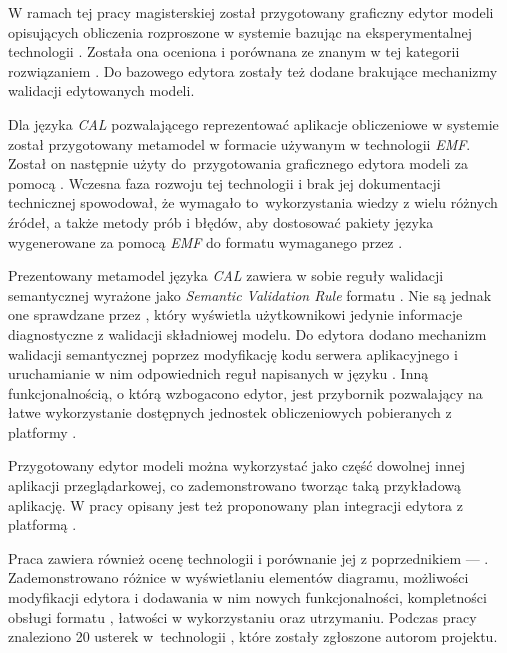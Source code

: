 W ramach tej pracy magisterskiej został przygotowany graficzny edytor modeli
opisujących obliczenia rozproszone w systemie \BalticLSC{} bazując na
eksperymentalnej technologii \SiriusWeb{}. Została ona oceniona i porównana ze
znanym w tej kategorii rozwiązaniem \SiriusDesktop{}. Do bazowego edytora
\SiriusWeb{} zostały też dodane brakujące mechanizmy walidacji edytowanych
modeli.

Dla języka \emph{\acrfull{CAL}} pozwalającego reprezentować aplikacje
obliczeniowe w systemie \BalticLSC{} został przygotowany metamodel w formacie
\Ecore{} używanym w technologii \emph{\acrfull{EMF}}. Został on następnie użyty
do~przygotowania graficznego edytora modeli za pomocą \SiriusWeb{}. Wczesna
faza rozwoju tej technologii i brak jej dokumentacji technicznej spowodował, że
wymagało to~wykorzystania wiedzy z wielu różnych źródeł, a także
metody prób i błędów, aby dostosować pakiety języka \Java{} wygenerowane za
pomocą \emph{\acrshort{EMF}} do formatu wymaganego przez \SiriusWeb{}.

Prezentowany metamodel języka \emph{\acrshort{CAL}} zawiera w sobie reguły
walidacji semantycznej wyrażone jako \emph{Semantic Validation Rule} formatu
\Ecore{}. Nie są jednak one sprawdzane przez \SiriusWeb{}, który wyświetla
użytkownikowi jedynie informacje diagnostyczne z walidacji składniowej modelu.
Do edytora dodano mechanizm walidacji semantycznej poprzez modyfikację kodu
serwera aplikacyjnego i uruchamianie w nim odpowiednich reguł napisanych w
języku \Java{}. Inną funkcjonalnością, o którą wzbogacono edytor, jest
przybornik pozwalający na łatwe wykorzystanie dostępnych jednostek
obliczeniowych pobieranych z platformy \BalticLSC{}.

Przygotowany edytor modeli można wykorzystać jako część dowolnej innej
aplikacji przeglądarkowej, co zademonstrowano tworząc taką przykładową
aplikację. W pracy opisany jest też proponowany plan integracji edytora z
platformą \BalticLSC{}.

Praca zawiera również ocenę technologii \SiriusWeb{} i porównanie jej z
poprzednikiem --- \SiriusDesktop{}. Zademonstrowano różnice w wyświetlaniu
elementów diagramu, możliwości modyfikacji edytora i dodawania w nim nowych
funkcjonalności, kompletności obsługi formatu \Ecore{}, łatwości w
wykorzystaniu oraz utrzymaniu. Podczas pracy znaleziono 20 usterek
w~technologii \SiriusWeb{}, które zostały zgłoszone autorom projektu.
